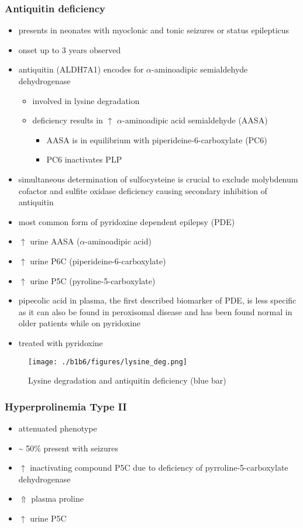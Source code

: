 \documentclass{scrartcl}
\begin{document}
\subsubsection{Antiquitin deficiency}
\label{sec:org23f965c}
\begin{itemize}
\item presents in neonates with myoclonic and tonic seizures or
status epilepticus
\item onset up to 3 years observed
\item antiquitin (ALDH7A1) encodes for \(\alpha\)-aminoadipic semialdehyde dehydrogenase
\begin{itemize}
\item involved in lysine degradation
\item deficiency results in \(\uparrow\) \(\alpha\)-aminoadipic acid semialdehyde (AASA)
\begin{itemize}
\item AASA is in equilibrium with piperideine-6-carboxylate (PC6)
\item PC6 inactivates PLP
\end{itemize}
\end{itemize}
\item simultaneous determination of sulfocysteine is crucial to exclude
molybdenum cofactor and sulfite oxidase deficiency causing secondary
inhibition of antiquitin
\item most common form of pyridoxine dependent epilepsy (PDE)
\item \(\uparrow\) urine AASA (\(\alpha\)-aminoadipic acid)
\item \(\uparrow\) urine P6C (piperideine-6-carboxylate)
\item \(\uparrow\) urine P5C (pyroline-5-carboxylate)
\item pipecolic acid in plasma, the first described biomarker of PDE, is
less specific as it can also be found in peroxisomal disease and has
been found normal in older patients while on pyridoxine
\item treated with pyridoxine
\end{itemize}

\begin{figure}[htbp]
\centering
\texttt{[image: ./b1b6/figures/lysine\_deg.png]}
\caption{\label{fig:org37a31a1}
Lysine degradation and antiquitin deficiency (blue bar)}
\end{figure}

\subsubsection{Hyperprolinemia Type II}
\label{sec:org393a3f2}
\begin{itemize}
\item attenuated phenotype
\item \textasciitilde{} 50\% present with seizures
\item \(\uparrow\) inactivating compound P5C due to deficiency of pyrroline-5-carboxylate dehydrogenase
\item \(\Uparrow\) plasma proline
\item \(\uparrow\) urine P5C
\end{itemize}
\end{document}
